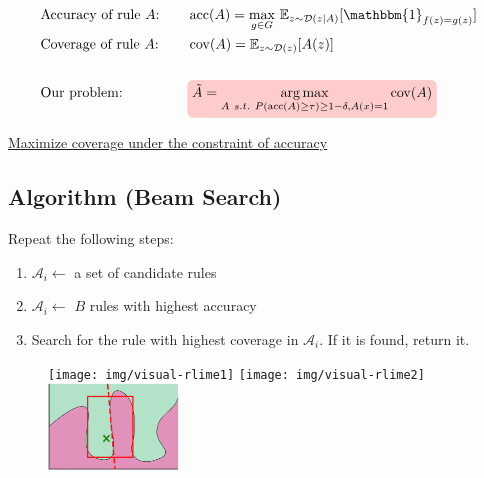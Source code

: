 \documentclass[aspectratio=169]{slide-en}
\begin{document}
{%
\vfuzz=13.08765pt
\begin{frame}{}
  \bigskip
  \bigskip
  \bigskip

  \begin{alignat*}{2}
     & \text{Accuracy of rule $A$:} & \quad & \Prec(A)=\underset{g\in G}{\max}
    \ \mathbb{E}_{z\sim\mathcal{D}(z|A)}[\mathbbm{1}_{f(z)=g(z)}]
    \COLabel{prec}{}
    \\
     & \text{Coverage of rule $A$:} & \quad & \operatorname{cov}(A)=
    \mathbb{E}_{z\sim\mathcal{D}(z)}[A(z)]
    \COLabel{cov}{}
    \\
    \\
     & \text{Our problem:}          & \quad & \colorrect{red!20}{$
        \tilde{A}=\underset{A\ s.t.
          \ P(\Prec(A)\ge\tau)\ge1-\delta,A(x)=1}  %
        {\arg\max}\operatorname{cov}(A)  %
      $}
    \COLabel{problem}{}
    \\
  \end{alignat*}

  \begin{center}
    \underline{Maximize coverage under the constraint of accuracy}
  \end{center}
\end{frame}
}

\subsection{Algorithm (Beam Search)}

\begin{frame}{}
  \bigskip
  \bigskip
  Repeat the following steps:
  \begin{enumerate}
    \item $\mathcal{A}_i\gets$ a set of candidate rules
    \item $\mathcal{A}_i\gets$ $B$ rules with highest accuracy
    \item Search for the rule with highest coverage in $\mathcal{A}_i$.
          If it is found, return it.
  \end{enumerate}
  \vspace{-1em}
  \begin{figure}[t]
    \centering
    \texttt{[image: img/visual-rlime1]}
    \texttt{[image: img/visual-rlime2]}
    \includegraphics[width=0.31\textwidth]{img/visual-rlime3}
  \end{figure}
\end{frame}
\end{document}
